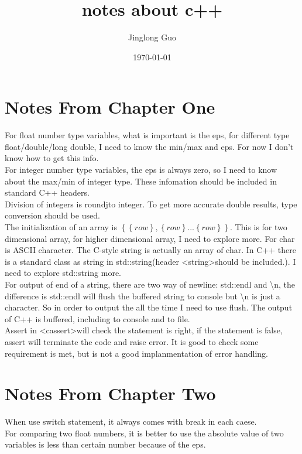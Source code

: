 \documentclass[11pt]{article}
\title{\textbf{notes about c++}}
\author{Jinglong Guo}
\date{\today}
\begin{document}
\maketitle
\thispagestyle{empty}

\section{Notes From Chapter One}
For float number type variables, what is important is the eps, for different type float/double/long double, I need to know the min/max and eps. For now I don't know how to get this info.\\
For integer number type variables, the eps is always zero, so I need to know about the max/min of integer type. These infomation should be included in standard C++ headers.\\
Division of integers is roundjto integer. To get more accurate double results, type conversion should be used.\\
The initialization of an array is $\left\{\left\{row\right\}, \left\{row\right\}...\left\{row\right\}\right\}$. This is for two dimensional array, for higher dimensional array, I need to explore more.
For char is ASCII character. The C-style string is actually an array of char. In C++ there is a standard class as string in std::string(header \textless string\textgreater \space should be included.). I need to explore std::string more.\\
For output of end of a string, there are two way of newline: std::endl and \textbackslash n, the difference is std::endl will flush the buffered string to console but \textbackslash n is just a character. So in order to output the all the time I need to use flush. The output of C++ is buffered, including to console and to file.\\
Assert in \textless cassert\textgreater \space will check the statement is right, if the statement is false, assert will terminate the code and raise error. It is good to check some requirement is met, but is not a good implanmentation of error handling.
\section{Notes From Chapter Two}
When use switch statement, it always comes with break in each caese.\\
For comparing two float numbers, it is better to use the absolute value of two variables is less than certain number because of the eps.
\end{document}
